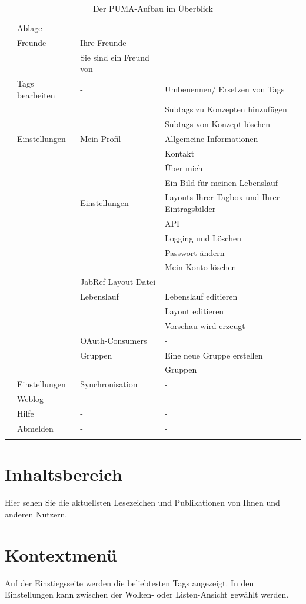 \begin{longtabu}{|X[l]|X[l]|X[l]|X[l]|}
&Ablage&-&-\\ 
&Freunde&Ihre Freunde&- \\ 
&&Sie sind ein Freund von&- \\ 
&Tags bearbeiten&-&Umbenennen/ Ersetzen von Tags\\ 
&&&Subtags zu Konzepten hinzufügen\\ 
&&&Subtags von Konzept löschen\\ 
&Einstellungen&Mein Profil&Allgemeine Informationen\\ 
&&&Kontakt\\ 
&&&Über mich\\ 
&&&Ein Bild für meinen Lebenslauf\\
&&Einstellungen&Layouts Ihrer Tagbox und Ihrer Eintragsbilder\\
&&&API\\
&&&Logging und Löschen\\
&&&Passwort ändern\\
&&&Mein Konto löschen\\
&&JabRef Layout-Datei&-\\
&&Lebenslauf& Lebenslauf editieren\\
&&&Layout editieren\\ 
&&&Vorschau wird erzeugt\\
&&OAuth-Consumers&- \\
&&Gruppen&Eine neue Gruppe erstellen\\
&&&Gruppen\\
&Einstellungen&Synchronisation&-\\
&Weblog&-&-\\
&Hilfe&-&-\\
&Abmelden&-&-\\\hline
\caption{Der PUMA-Aufbau im Überblick}
\label{tab:pumaAufbau}
\end{longtabu}


\section{Inhaltsbereich}
\label{sec:inhaltsbereich}
Hier sehen Sie die aktuellsten Lesezeichen und Publikationen von Ihnen und anderen Nutzern. 
\section{Kontextmenü}
\label{sec:kontextmenue}
Auf der Einstiegsseite werden die beliebtesten Tags angezeigt. In den Einstellungen kann zwischen der Wolken- oder Listen-Ansicht gewählt werden.